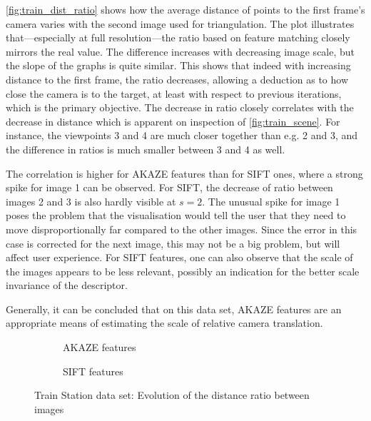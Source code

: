 \autoref{fig:train_dist_ratio} shows how the average distance of points to the
first frame's camera varies with the second image used for triangulation. The
plot illustrates that---especially at full resolution---the ratio based on
feature matching closely mirrors the real value. The difference increases with
decreasing image scale, but the slope of the graphs is quite similar. This
shows that indeed with increasing distance to the first frame, the ratio
decreases, allowing a deduction as to how close the camera is to the target, at
least with respect to previous iterations, which is the primary objective. 
The decrease in ratio closely correlates with the decrease in distance which
is apparent on inspection of \autoref{fig:train_scene}. For instance, the viewpoints
3 and 4 are much closer together than e.g. 2 and 3, and the difference in ratios
is much smaller between 3 and 4 as well. 

The correlation is higher for AKAZE
features than for SIFT ones, where a strong spike for image 1 can be observed.
For SIFT, the decrease of ratio between images 2 and 3 is also hardly visible at
$s=2$. The unusual spike for image 1 poses the problem that the visualisation
would tell the user that they need to move disproportionally far compared to
the other images. Since the error in this case is corrected for the next image,
this may not be a big problem, but will affect user experience. For SIFT
features, one can also observe that the scale of the images appears to be less
relevant, possibly an indication for the better scale invariance of the
descriptor.

Generally, it can be concluded that on this data set, AKAZE features are an
appropriate means of estimating the scale of relative camera translation.

\begin{figure}
   \begin{subfigure}{.5\linewidth}
      \centering      
      
      \caption{AKAZE features}
      \label{fig:train_KAZE_dist_ratio}
   \end{subfigure}
   \quad
   \begin{subfigure}{.5\linewidth}
      \centering      
      
      \caption{SIFT features}
      \label{fig:train_SIFT_dist_ratio}
   \end{subfigure}
   \caption[Train data: Distance ratio]{Train Station data set: Evolution of the distance ratio between images}
   \label{fig:train_dist_ratio}
\end{figure}

